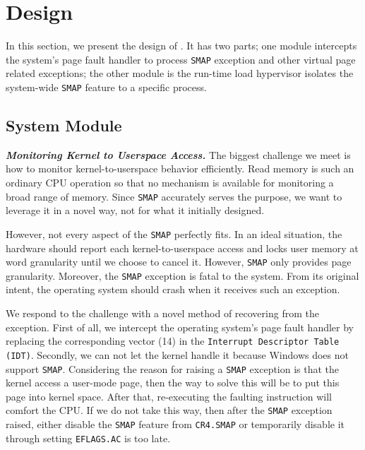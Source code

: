 
\section{\name Design}
\label{sec:design}

In this section, we present the design of \name. It has two parts; one module intercepts the system's page fault handler to process \texttt{SMAP} exception and other virtual page related exceptions; the other module is the run-time load hypervisor isolates the system-wide \texttt{SMAP} feature to a specific process.

\subsection{System Module}

\textbf{\textit{Monitoring Kernel to Userspace Access.}} The biggest challenge we meet is how to monitor kernel-to-userspace behavior efficiently. Read memory is such an ordinary CPU operation so that no mechanism is available for monitoring a broad range of memory. Since \texttt{SMAP} accurately serves the purpose, we want to leverage it in a novel way, not for what it initially designed.

However, not every aspect of the \texttt{SMAP} perfectly fits. In an ideal situation, the hardware should report each kernel-to-userspace access and locks user memory at word granularity until we choose to cancel it.  However, \texttt{SMAP} only provides page granularity. Moreover, the \texttt{SMAP} exception is fatal to the system. From its original intent, the operating system should crash when it receives such an exception.



We respond to the challenge with a novel method of recovering from the exception. First of all, we intercept the operating system's page fault handler by replacing the corresponding vector (14) in the \texttt{Interrupt Descriptor Table (IDT)}. Secondly, we can not let the kernel handle it because Windows does not support \texttt{SMAP}. Considering the reason for raising a \texttt{SMAP} exception is that the kernel access a user-mode page, then the way to solve this will be to put this page into kernel space. After that, re-executing the faulting instruction will comfort the CPU. If we do not take this way, then after the \texttt{SMAP} exception raised, either disable the \texttt{SMAP} feature from \texttt{CR4.SMAP} or temporarily disable it through setting \texttt{EFLAGS.AC} is too late. 

